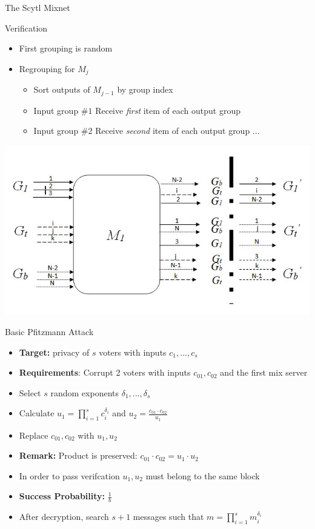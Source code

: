 \documentclass{beamer}
\begin{document}
\begin{frame}[allowframebreaks]{The Scytl Mixnet \cite{SCYTL10}}
\begin{block}{Verification}
\begin{itemize}
\begin{itemize}
\item First grouping is random
\item Regrouping for $M_j$
\begin{itemize}
\item Sort outputs of $M_{j-1}$ by group index
\item Input group $\#1$ Receive \textit{first} item of each output group
\item Input group $\#2$ Receive \textit{second} item of each output group ...
\end{itemize}
\end{itemize}
\end{itemize}
\end{block}
\begin{center}
\includegraphics[scale=0.4]{scytl1.jpg}
\end{center}
\end{frame}

\begin{frame}{Basic Pfitzmann Attack}
\begin{itemize}
\item \textbf{Target:} privacy of $s$ voters with inputs $c_1,...,c_s$
\item \textbf{Requirements}: Corrupt 2 voters with inputs $c_{01},c_{02}$ and the first mix server
\item Select $s$ random exponents $\delta_1, ..., \delta_s$
\item Calculate $u_1=\prod_{i=1}^s c_i^{\delta_i}$ and $u_2 = \frac{c_{01} \cdot c_{02}}{u_1}$
\item Replace $c_{01},c_{02}$ with $u_1,u_2$
\item \textbf{Remark:} Product is preserved: $c_{01} \cdot c_{02} = u_1 \cdot u_2$
\item In order to pass verifcation $u_1,u_2$ must belong to the same block
\item \textbf{Success Probability:} $\frac{1}{b}$
\item After decryption, search $s+1$ messages such that $ m = \prod_{i=1}^s m_i^{\delta_i}$
\end{itemize}
\end{frame}
\end{document}
